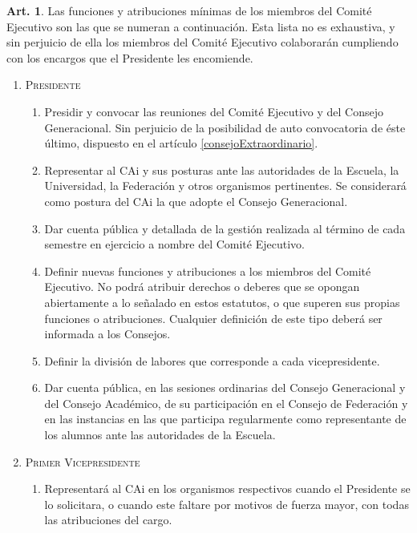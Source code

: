 \documentclass[letterpaper,11pt]{article}
\theoremstyle{definition}%
\newtheorem{art}{Art.} %
\newcommand{\aref}[1]{\hyperref[#1]{\ref*{#1}}}
\begin{document}
\begin{art}%
	Las funciones y atribuciones mínimas de los miembros del Comité Ejecutivo son las que se numeran a continuación. Esta lista no es exhaustiva, y sin perjuicio de ella los miembros del Comité Ejecutivo colaborarán cumpliendo con los encargos que el Presidente les encomiende.
	\begin{enumerate}
		\item \label{funciones_presidente}\textsc{Presidente}
		      \begin{enumerate}
			      \item Presidir y convocar las reuniones del Comité Ejecutivo y del Consejo Generacional. Sin perjuicio de la posibilidad de auto convocatoria de éste último, dispuesto en el artículo \aref{consejoExtraordinario}.

			      \item Representar al CAi y sus posturas ante las autoridades de la Escuela, la Universidad, la Federación y otros organismos pertinentes. Se considerará como postura del CAi la que adopte el Consejo Generacional.

			      \item Dar cuenta pública y detallada de la gestión realizada al término de cada semestre en ejercicio a nombre del Comité Ejecutivo.

			      \item Definir nuevas funciones y atribuciones a los miembros del Comité Ejecutivo. No podrá atribuir derechos o deberes que se opongan abiertamente a lo señalado en estos estatutos, o que superen sus propias funciones o atribuciones. Cualquier definición de este tipo deberá ser informada a los Consejos.

			      \item Definir la división de labores que corresponde a cada vicepresidente.

			      \item Dar cuenta pública, en las sesiones ordinarias del Consejo Generacional y del Consejo Académico, de su participación en el Consejo de Federación y en las instancias en las que participa regularmente como representante de los alumnos ante las autoridades de la Escuela.
		      \end{enumerate}

		\item \textsc{Primer Vicepresidente}
		      \begin{enumerate}
			      \item Representará al CAi en los organismos respectivos cuando el Presidente se lo solicitara, o cuando este faltare por motivos de fuerza mayor, con todas las atribuciones del cargo.


\end{enumerate}
\end{enumerate}
\end{art}
\end{document}
